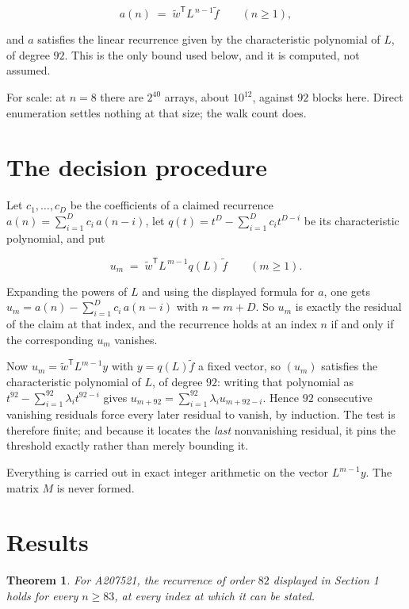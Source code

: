 \documentclass[11pt]{article}
\newtheorem{theorem}{Theorem}
\theoremstyle{definition}
\begin{document}
\[a(n) \;=\; \tilde w^{\mathsf T} L^{\,n-1} \tilde f \qquad (n \ge 1),\]

and $a$ satisfies the linear recurrence given by the characteristic polynomial of $L$, of degree $92$. This is the only bound used below, and it is computed, not assumed.

For scale: at $n = 8$ there are $2^{40}$ arrays, about $10^{12}$, against $92$ blocks here. Direct enumeration settles nothing at that size; the walk count does.

\section{The decision procedure}

Let $c_1,\dots,c_D$ be the coefficients of a claimed recurrence $a(n) = \sum_{i=1}^{D} c_i\,a(n-i)$, let $q(t) = t^{D} - \sum_{i=1}^{D} c_i t^{D-i}$ be its characteristic polynomial, and put

\[u_m \;=\; \tilde w^{\mathsf T} L^{\,m-1} q(L)\,\tilde f \qquad (m \ge 1).\]

Expanding the powers of $L$ and using the displayed formula for $a$, one gets $u_m = a(n) - \sum_{i=1}^{D} c_i\,a(n-i)$ with $n = m + D$. So $u_m$ is exactly the residual of the claim at that index, and the recurrence holds at an index $n$ if and only if the corresponding $u_m$ vanishes.

Now $u_m = \tilde w^{\mathsf T} L^{m-1} y$ with $y = q(L)\tilde f$ a fixed vector, so $(u_m)$ satisfies the characteristic polynomial of $L$, of degree $92$: writing that polynomial as $t^{92} - \sum_{i=1}^{92} \lambda_i t^{92-i}$ gives $u_{m+92} = \sum_{i=1}^{92} \lambda_i u_{m+92-i}$. Hence $92$ consecutive vanishing residuals force every later residual to vanish, by induction. The test is therefore finite; and because it locates the {\itshape last} nonvanishing residual, it pins the threshold exactly rather than merely bounding it.

Everything is carried out in exact integer arithmetic on the vector $L^{m-1}y$. The matrix $M$ is never formed.

\section{Results}

\begin{theorem} For A207521, the recurrence of order $82$ displayed in Section 1 holds for every $n \ge 83$, at every index at which it can be stated.\end{theorem}
\end{document}
